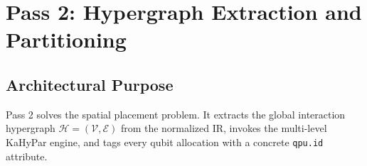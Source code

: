 
\section{Pass 2: Hypergraph Extraction and Partitioning}
\label{sec:pass2_partitioning}

\subsection{Architectural Purpose}
Pass 2 solves the spatial placement problem. It extracts the global interaction hypergraph $\mathcal{H} = (\mathcal{V}, \mathcal{E})$ from the normalized IR, invokes the multi-level KaHyPar engine, and tags every qubit allocation with a concrete \texttt{qpu.id} attribute.

